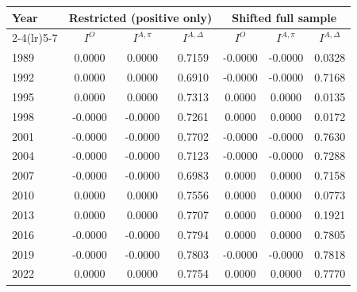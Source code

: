 \begin{tabular}{lcccccc}
\toprule
Year & \multicolumn{3}{c}{Restricted (positive only)} & \multicolumn{3}{c}{Shifted full sample} \\
\cmidrule(lr){2-4}\cmidrule(lr){5-7}
& $I^{O}$ & $I^{A,\pi}$ & $I^{A,\Delta}$ & $I^{O}$ & $I^{A,\pi}$ & $I^{A,\Delta}$ \\
\midrule
1989 & 0.0000 & 0.0000 & 0.7159 & -0.0000 & -0.0000 & 0.0328 \\
1992 & 0.0000 & 0.0000 & 0.6910 & -0.0000 & -0.0000 & 0.7168 \\
1995 & 0.0000 & 0.0000 & 0.7313 & 0.0000 & 0.0000 & 0.0135 \\
1998 & -0.0000 & -0.0000 & 0.7261 & 0.0000 & 0.0000 & 0.0172 \\
2001 & -0.0000 & -0.0000 & 0.7702 & -0.0000 & -0.0000 & 0.7630 \\
2004 & -0.0000 & -0.0000 & 0.7123 & -0.0000 & -0.0000 & 0.7288 \\
2007 & -0.0000 & -0.0000 & 0.6983 & 0.0000 & 0.0000 & 0.7158 \\
2010 & 0.0000 & 0.0000 & 0.7556 & 0.0000 & 0.0000 & 0.0773 \\
2013 & 0.0000 & 0.0000 & 0.7707 & 0.0000 & 0.0000 & 0.1921 \\
2016 & -0.0000 & -0.0000 & 0.7794 & 0.0000 & 0.0000 & 0.7805 \\
2019 & -0.0000 & -0.0000 & 0.7803 & -0.0000 & -0.0000 & 0.7818 \\
2022 & 0.0000 & 0.0000 & 0.7754 & 0.0000 & 0.0000 & 0.7770 \\
\bottomrule
\end{tabular}

